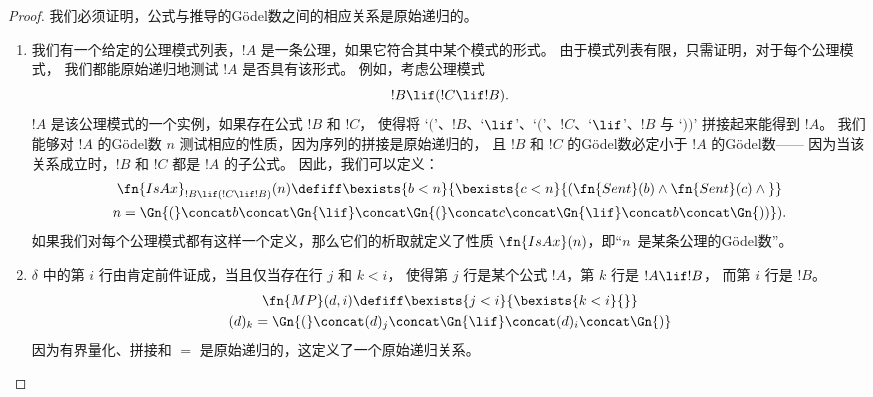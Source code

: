 \documentclass[../../../include/open-logic-section]{subfiles}
\begin{document}
\begin{proof}
我们必须证明，公式与推导的Gödel数之间的相应关系是原始递归的。
\begin{enumerate}
\item 我们有一个给定的公理模式列表，$!A$ 是一条公理，如果它符合其中某个模式的形式。
  由于模式列表有限，只需证明，对于每个公理模式，
  我们都能原始递归地测试 $!A$ 是否具有该形式。
  例如，考虑公理模式
  \[
  !B \lif (!C \lif !B).
  \]
  $!A$ 是该公理模式的一个实例，如果存在公式 $!B$ 和 $!C$，
  使得将 `$($'、$!B$、`$\lif$'、`$($'、$!C$、`$\lif$'、$!B$ 与 `$))$' 拼接起来能得到 $!A$。
  我们能够对 $!A$ 的Gödel数 $n$ 测试相应的性质，因为序列的拼接是原始递归的，
  且 $!B$ 和 $!C$ 的Gödel数必定小于 $!A$ 的Gödel数——
  因为当该关系成立时，$!B$ 和 $!C$ 都是 $!A$ 的子公式。
  因此，我们可以定义：
  \begin{multline*}
  \fn{IsAx}_{!B \lif (!C \lif !B)}(n) \defiff \bexists{b< n}{
    \bexists{c < n}{(\fn{Sent}(b) \land \fn{Sent}(c) \land {}}}\\ n =
  \Gn{(} \concat b \concat \Gn{\lif} \concat \Gn{(} \concat c \concat
  \Gn{\lif} \concat b \concat \Gn{))}).
  \end{multline*}
  如果我们对每个公理模式都有这样一个定义，那么它们的析取就定义了性质
  $\fn{IsAx}(n)$，即“$n$~是某条公理的Gödel数”。

\item $\delta$ 中的第 $i$ 行由肯定前件证成，当且仅当存在行 $j$ 和 $k < i$，
  使得第 $j$ 行是某个公式 $!A$，第 $k$ 行是 $!A \lif !B$，
  而第 $i$ 行是 $!B$。
  \begin{multline*}
    \fn{MP}(d, i) \defiff \bexists{j < i}{\bexists{k < i}{}}\\
    (d)_k = \Gn{(} \concat (d)_j
      \concat \Gn{\lif} \concat (d)_i \concat \Gn{)}
  \end{multline*}
  因为有界量化、拼接和 $=$ 是原始递归的，这定义了一个原始递归关系。


\end{enumerate}
\end{proof}
\end{document}
